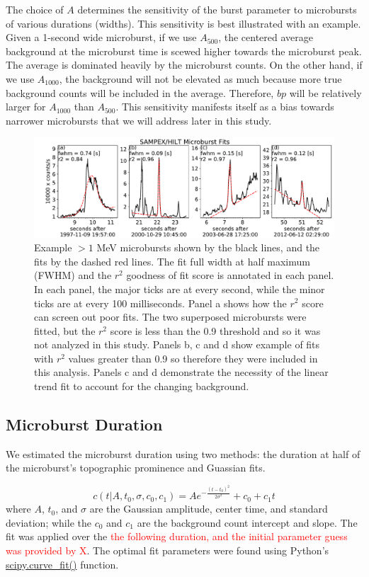 \documentclass[draft]{agujournal2019}
\begin{document}
The choice of $A$ determines the sensitivity of the burst parameter to microbursts of various durations (widths). This sensitivity is best illustrated with an example. Given a 1-second wide microburst, if we use $A_{500}$, the centered average background at the microburst time is scewed higher towards the microburst peak. The average is dominated heavily by the microburst counts. On the other hand, if we use $A_{1000}$, the background will not be elevated as much because more true background counts will be included in the average. Therefore, $bp$ will be relatively larger for $A_{1000}$ than $A_{500}$. This sensitivity manifests itself as a bias towards narrower microbursts that we will address later in this study. 

\begin{figure}
\noindent\includegraphics[width=\textwidth]{figures/fig1.pdf}
\caption{Example $>1$ MeV microbursts shown by the black lines, and the fits by the dashed red lines. The fit full width at half maximum (FWHM) and the $r^2$ goodness of fit score is annotated in each panel. In each panel, the major ticks are at every second, while the minor ticks are at every 100 milliseconds. Panel a shows how the $r^2$ score can screen out poor fits. The two superposed microbursts were fitted, but the $r^2$ score is less than the 0.9 threshold and so it was not analyzed in this study. Panels b, c and d show example of fits with $r^2$ values greater than 0.9 so therefore they were included in this analysis. Panels c and d demonstrate the necessity of the linear trend fit to account for the changing background.}
\label{fig1}
\end{figure}

\subsection{Microburst Duration}
We estimated the microburst duration using two methods: the duration at half of the microburst's topographic prominence and Guassian fits.

\begin{equation}
c(t | A, t_0, \sigma, c_0, c_1) = A e^{-\frac{(t-t_0)^2}{2\sigma^2}} + c_0 + c_1 t
\end{equation} where $A$, $t_0$, and $\sigma$ are the Gaussian amplitude, center time, and standard deviation; while the $c_0$ and $c_1$ are the background count intercept and slope. The fit was applied over the \textcolor{red}{the following duration, and the initial parameter guess was provided by X}. The optimal fit parameters were found using Python's \url{scipy.curve_fit()} function.
\end{document}
